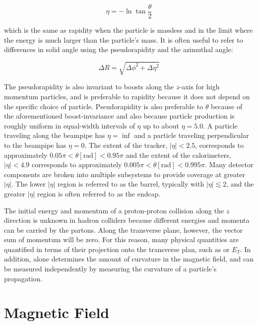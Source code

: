 \begin{equation}\label{eq:pseudorapidity}
\eta = - \ln \tan \frac{\theta}{2}
\end{equation}

\noindent which is the same as rapidity when the particle is massless and in the limit where the energy is much larger than the particle's mass.
It is often useful to refer to differences in solid angle using the pseudorapidity and the azimuthal angle:

\begin{equation}\label{eq:deltar}
\Delta R = \sqrt{\Delta \phi^2 + \Delta \eta^2}
\end{equation}


The pseudorapidity is also invariant to boosts along the $z$-axis for high momentum particles, and is preferable to rapidity because it does not depend on the specific choice of particle.
Pseudorapidity is also preferable to $\theta$ because of the aforementioned boost-invariance and also because particle production is roughly uniform in equal-width intervals of $\eta$ up to about $\eta = 5.0$. 
A particle traveling along the beampipe has $\eta = \inf$ and a particle traveling perpendicular to the beampipe has $\eta = 0$.
The extent of the tracker, $|\eta| < 2.5$, corresponds to approximately $0.05 \pi < \theta [\mathrm{rad}] < 0.95 \pi$ and the extent of the calorimeters, $|\eta| < 4.9$ corresponds to approximately $0.005 \pi < \theta [\mathrm{rad}] < 0.995 \pi$.
Many detector components are broken into multiple subsystems to provide coverage at greater $|\eta|$.
The lower $|\eta|$ region is referred to as the barrel, typically with $|\eta| \lesssim 2$, and the greater $|\eta|$ region is often referred to as the endcap.

The initial energy and momentum of a proton-proton collision along the $z$ direction is unknown in hadron colliders because different energies and momenta can be carried by the partons.
Along the transverse plane, however, the vector sum of momentum will be zero.
For this reason, many physical quantities are quantified in terms of their projection onto the transverse plan, such as \pt or $E_T$.
In addition, \pt alone determines the amount of curvature in the magnetic field, and can be measured independently by measuring the curvature of a particle's propagation.


\section{Magnetic Field}
\label{sec:magnetic_field}

